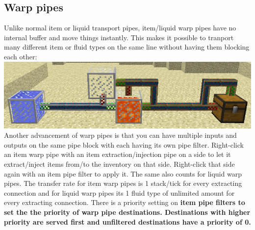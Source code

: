 \documentclass[11pt]{article} %
\begin{document}
\subsection{Warp pipes}
Unlike normal item or liquid transport pipes, item/liquid warp pipes have no internal buffer and move things instantly. This makes it possible to tranport many different item or fluid types on the same line without having them blocking each other:\\
\includegraphics[width = \textwidth]{warpPipes}\\
 Another advancement of warp pipes is that you can have multiple inputs and outputs on the same pipe block with each having its own pipe filter. Right-click an item warp pipe with an item extraction/injection pipe on a side to let it extract/inject items from/to the inventory on that side. Right-click that side again with an item pipe filter to apply it. The same also counts for liquid warp pipes. The transfer rate for item warp pipes is 1 stack/tick for every extracting connection and for liquid warp pipes its 1 fluid type of unlimited amount for every extracting connection. There is a priority setting on \bf item pipe filters \rm to set the the priority of warp pipe destinations. Destinations with higher priority are served first and unfiltered destinations have a priority of 0.
\end{document}
